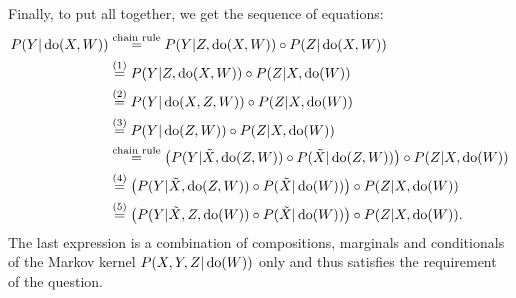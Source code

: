 {Finally, to put all together, we get the sequence of equations:
\begin{align}
    P(Y|\operatorname{do}(X,W)) 
&\stackrel{\text{chain rule}}{=} P(Y|Z,\operatorname{do}(X,W)) \circ P(Z|\operatorname{do}(X,W)) \\
&\stackrel{(1)}{=} P(Y|Z,\operatorname{do}(X,W)) \circ P(Z|X,\operatorname{do}(W)) \\
&\stackrel{(2)}{=} P(Y|\operatorname{do}(X,Z,W)) \circ P(Z|X,\operatorname{do}(W)) \\
&\stackrel{(3)}{=} P(Y|\operatorname{do}(Z,W)) \circ P(Z|X,\operatorname{do}(W)) \\
&\stackrel{\text{chain rule}}{=} \left ( P(Y|\tilde X, \operatorname{do}(Z,W)) \circ P(\tilde X|\operatorname{do}(Z,W)) \right ) \circ P(Z|X,\operatorname{do}(W)) \\
&\stackrel{(4)}{=} \left ( P(Y|\tilde X, \operatorname{do}(Z,W)) \circ P(\tilde X|\operatorname{do}(W)) \right ) \circ P(Z|X,\operatorname{do}(W)) \\
&\stackrel{(5)}{=} \left ( P(Y|\tilde X,Z,\operatorname{do}(W)) \circ P(\tilde X|\operatorname{do}(W)) \right ) \circ P(Z|X,\operatorname{do}(W)).
\end{align}
The last expression is a combination of compositions, marginals and conditionals of the Markov kernel $P(X,Y,Z|\operatorname{do}(W))$ only and thus satisfies the requirement of the question.


}
